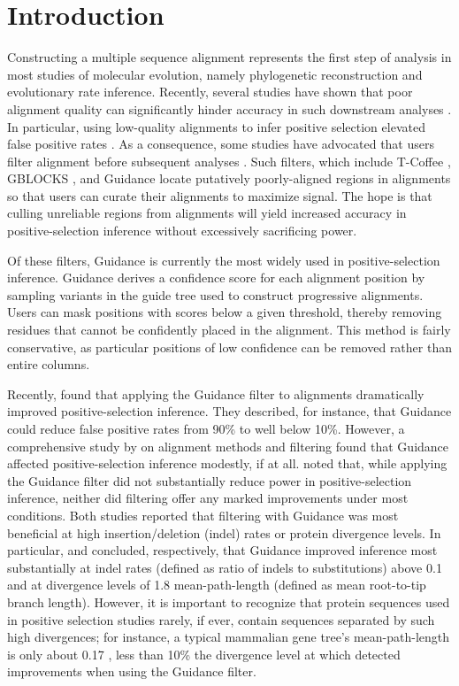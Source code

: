 \documentclass[11pt]{article}
\begin{document}
\section*{Introduction}
Constructing a multiple sequence alignment represents the first step of analysis in most studies of molecular evolution, namely phylogenetic reconstruction and evolutionary rate inference. Recently, several studies have shown that poor alignment quality can significantly hinder accuracy in such downstream analyses \citep{Ogden2006, Talavera2007, Dwivedi2009, MarkovaRaina2011, Jordan2012}. In particular, using low-quality alignments to infer positive selection elevated false positive rates \citep{Schneider2009, Fletcher2010, MarkovaRaina2011}. As a consequence, some studies have advocated that users filter alignment before subsequent analyses \citep{Jordan2012,Privman2012}. Such filters, which include T-Coffee \citep{Notredame2000}, GBLOCKS \citep{Castresana2000}, and Guidance \citep{Penn2010, Privman2012} locate putatively poorly-aligned regions in alignments so that users can curate their alignments to maximize signal. The hope is that culling unreliable regions from alignments will yield increased accuracy in positive-selection inference without excessively sacrificing power.

Of these filters, Guidance \citep{Penn2010,Privman2012} is currently the most widely used in positive-selection inference. Guidance derives a confidence score for each alignment position by sampling variants in the guide tree used to construct progressive alignments. Users can mask positions with scores below a given threshold, thereby removing residues that cannot be confidently placed in the alignment. This method is fairly conservative, as particular positions of low confidence can be removed rather than entire columns. 

Recently, \citet{Privman2012} found that applying the Guidance filter to alignments dramatically improved positive-selection inference. They described, for instance, that Guidance could reduce false positive rates from 90\% to well below 10\%. However, a comprehensive study by \citet{Jordan2012} on alignment methods and filtering found that Guidance affected positive-selection inference modestly, if at all. \citet{Jordan2012} noted that, while applying the Guidance filter did not substantially reduce power in positive-selection inference, neither did filtering offer any marked improvements under most conditions. Both studies reported that filtering with Guidance was most beneficial at high insertion/deletion (indel) rates or protein divergence levels. In particular, \citet{Privman2012} and \citet{Jordan2012} concluded, respectively, that Guidance improved inference most substantially at indel rates (defined as ratio of indels to substitutions) above 0.1 and at divergence levels of 1.8 mean-path-length (defined as mean root-to-tip branch length). However, it is important to recognize that protein sequences used in positive selection studies rarely, if ever, contain sequences separated by such high divergences; for instance, a typical mammalian gene tree's mean-path-length is only about 0.17 \citep{Spielman2013}, less than 10\% the divergence level at which \citet{Jordan2012} detected improvements when using the Guidance filter.
\end{document}
